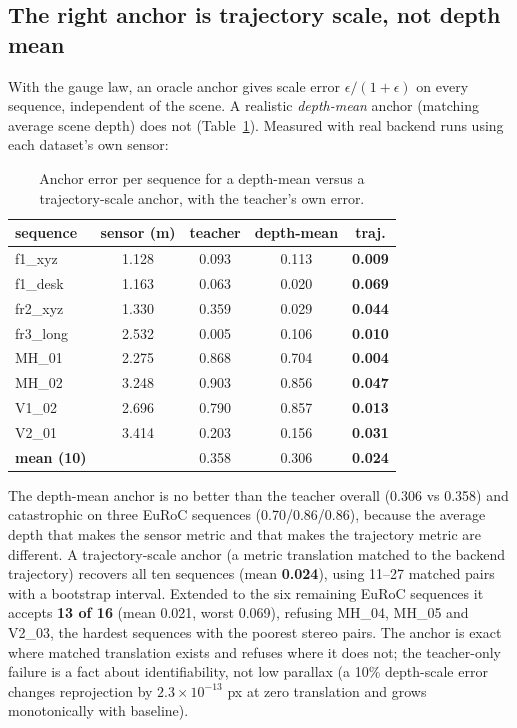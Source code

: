 \subsection{The right anchor is trajectory scale, not depth mean}
\label{sec:anchor}

With the gauge law, an oracle anchor gives scale error $\epsilon/(1+\epsilon)$ on
every sequence, independent of the scene. A realistic \emph{depth-mean} anchor
(matching average scene depth) does not (Table~\ref{tab:anchor}). Measured
with real backend runs using each dataset's own sensor:

\begin{table}[t]
\centering
\caption{Anchor error per sequence for a depth-mean versus a trajectory-scale
anchor, with the teacher's own error.}
\label{tab:anchor}
\footnotesize
\setlength{\tabcolsep}{4pt}
\begin{tabular}{@{}lcccc@{}}
\toprule
sequence & sensor (m) & teacher & depth-mean & traj. \\
\midrule
f1\_xyz & 1.128 & 0.093 & 0.113 & \textbf{0.009} \\
f1\_desk & 1.163 & 0.063 & 0.020 & \textbf{0.069} \\
fr2\_xyz & 1.330 & 0.359 & 0.029 & \textbf{0.044} \\
fr3\_long & 2.532 & 0.005 & 0.106 & \textbf{0.010} \\
MH\_01 & 2.275 & 0.868 & 0.704 & \textbf{0.004} \\
MH\_02 & 3.248 & 0.903 & 0.856 & \textbf{0.047} \\
V1\_02 & 2.696 & 0.790 & 0.857 & \textbf{0.013} \\
V2\_01 & 3.414 & 0.203 & 0.156 & \textbf{0.031} \\
\midrule
\textbf{mean (10)} & & 0.358 & 0.306 & \textbf{0.024} \\
\bottomrule
\end{tabular}
\end{table}

\noindent The depth-mean anchor is no better than the teacher overall (0.306 vs
0.358) and catastrophic on three EuRoC sequences (0.70/0.86/0.86), because the
average depth that makes the sensor metric and that makes the trajectory metric
are different. A trajectory-scale anchor (a metric translation matched to the
backend trajectory) recovers all ten sequences (mean \textbf{0.024}), using
11--27 matched pairs with a bootstrap interval. Extended to the six remaining
EuRoC sequences it accepts \textbf{13 of 16} (mean 0.021, worst 0.069), refusing
MH\_04, MH\_05 and V2\_03, the hardest sequences with the poorest stereo pairs.
The anchor is exact where matched translation exists and refuses where it does
not; the teacher-only failure is a fact about identifiability, not low parallax
(a 10\% depth-scale error changes reprojection by $2.3\times10^{-13}$ px at zero
translation and grows monotonically with baseline).

